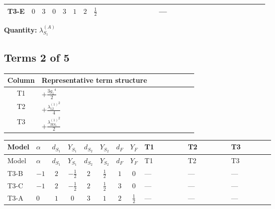 \documentclass[8pt]{article}
\begin{document}
\begin{landscape}
\begin{longtable}{@{}llcccccc >{\raggedright\arraybackslash}p{0.21\linewidth} >{\raggedright\arraybackslash}p{0.21\linewidth} >{\raggedright\arraybackslash}p{0.21\linewidth}@{}}
\midrule
T3-E & $0$ & $3$ & $0$ & $3$ & $1$ & $2$ & $\frac{1}{2}$ & \scriptsize\adjustbox{max width=\linewidth}{$\begin{gathered} \frac{3 {g_2}^4}{4}\end{gathered}$} & --- & \scriptsize\adjustbox{max width=\linewidth}{$\begin{gathered} +{g_2}^2 (-3 {\lambda_{S_1}^{(1)}}-24 {\lambda_{S_1}^{(A)}})\end{gathered}$} \\
\midrule
\bottomrule
\end{longtable}
\clearpage
\noindent\textbf{Quantity: }$\lambda_{S_1}^{(A)}$\par\smallskip
\subsection*{Terms 2 of 5}
\begin{center}
\begin{tabular}{@{}c >{\raggedright\arraybackslash}p{0.82\linewidth}@{}}
\toprule
Column & Representative term structure \\
\midrule
T1 & \(\displaystyle +\frac{3 {g_1}^4}{2}\) \\
\midrule
T2 & \(\displaystyle +\frac{{\lambda_{12}^{(1)}}^2}{4}\) \\
\midrule
T3 & \(\displaystyle +\frac{{\lambda_{HS_1}^{(1)}}^2}{2}\) \\
\midrule
\bottomrule
\end{tabular}
\end{center}
\smallskip
\tiny
\begin{longtable}{@{}llcccccc >{\raggedright\arraybackslash}p{0.21\linewidth} >{\raggedright\arraybackslash}p{0.21\linewidth} >{\raggedright\arraybackslash}p{0.21\linewidth}@{}}
\toprule
Model & $\alpha$ & $d_{S_1}$ & $Y_{S_1}$ & $d_{S_2}$ & $Y_{S_2}$ & $d_F$ & $Y_F$ & T1 & T2 & T3 \\
\midrule
\endfirsthead
\toprule
Model & $\alpha$ & $d_{S_1}$ & $Y_{S_1}$ & $d_{S_2}$ & $Y_{S_2}$ & $d_F$ & $Y_F$ & T1 & T2 & T3 \\
\midrule
\endhead
T3-B & $-1$ & $2$ & $-\frac{1}{2}$ & $2$ & $\frac{1}{2}$ & $1$ & $0$ & --- & --- & --- \\
\midrule
T3-C & $-1$ & $2$ & $-\frac{1}{2}$ & $2$ & $\frac{1}{2}$ & $3$ & $0$ & --- & --- & --- \\
\midrule
T3-A & $0$ & $1$ & $0$ & $3$ & $1$ & $2$ & $\frac{1}{2}$ & --- & --- & --- \\
\midrule

\end{longtable}
\end{landscape}
\end{document}
